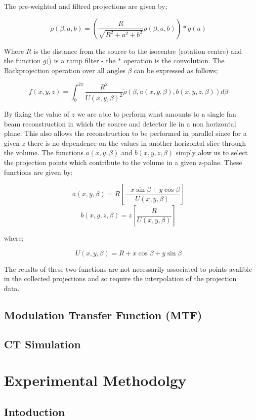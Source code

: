 \documentclass[
  twoside,
  11pt, a4paper,
  footinclude=true,
  headinclude=true,
  cleardoublepage=empty
]{scrbook}
\begin{document}
The pre-weighted and filtred projections are given by;

\[
\tilde{\rho}(\beta,a,b) = (\frac{R}{\sqrt{R^2+a^2+b^2}}\rho(\beta,a,b))\ast g(a)
\]

Where $R$ is the distance from the source to the isocentre (rotation centre) and the function $g(\dot)$ is a ramp filter - the $\ast$ operation is the convolution. The Backprojection operation over all angles $\beta$ can be expressed as follows;

\[
f(x,y,z) = \int_0^{2\pi} \frac{R^2}{U(x,y,\beta)^2} \tilde{\rho}(\beta,a(x,y,\beta),b(x,y,z,\beta)) d\beta
\]

By fixing the value of $z$ we are able to perform what amounts to a single fan beam reconstruction in which the source and detector lie in a non horizontal plane. This also allows the reconstruction to be performed in parallel since for a given $z$ there is no dependence on the values in another horizontal slice through the volume. The functions $a(x,y,\beta)$ and $b(x,y,z,\beta)$ simply alow us to select the projection points which contribute to the volume in a given z-palne. These functions are given by;


\[
a(x,y,\beta) = R[\frac{-x \sin \beta + y \cos \beta}{U(x,y,\beta)}]
\]
\[
b(x,y,z,\beta) = z[\frac{R}{U(x,y,\beta)}]
\]

where;

\[
U(x,y,\beta) = R + x \cos \beta + y \sin \beta
\]

The reuslts of these two functions are not necessarily associated to points avalible in the collected projections and so require the interpolation of the projection data.  


\section{Modulation Transfer Function (MTF)}

\section{CT Simulation}

\chapter{Experimental Methodolgy}
\section{Intoduction}
\end{document}
